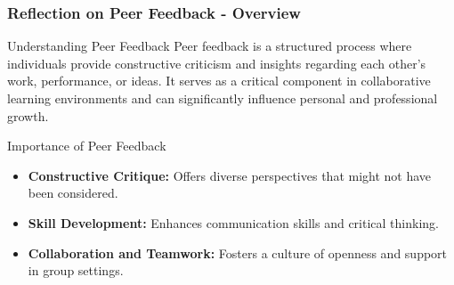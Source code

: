 \documentclass[aspectratio=169]{beamer}
\begin{document}
\begin{frame}[fragile]
    \frametitle{Reflection on Peer Feedback - Overview}
    \begin{block}{Understanding Peer Feedback}
        Peer feedback is a structured process where individuals provide constructive criticism and insights regarding each other's work, performance, or ideas. It serves as a critical component in collaborative learning environments and can significantly influence personal and professional growth.
    \end{block}
    
    \begin{block}{Importance of Peer Feedback}
        \begin{itemize}
            \item \textbf{Constructive Critique:} Offers diverse perspectives that might not have been considered.
            \item \textbf{Skill Development:} Enhances communication skills and critical thinking.
            \item \textbf{Collaboration and Teamwork:} Fosters a culture of openness and support in group settings.
        \end{itemize}
    \end{block}
\end{frame}
\end{document}
